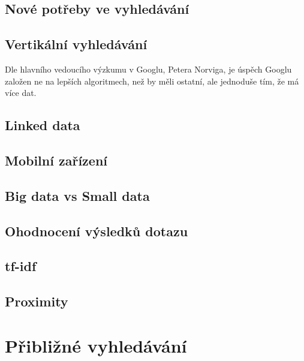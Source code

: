 \documentclass[11pt]{article}
\begin{document}

\subsection{Nové potřeby ve vyhledávání}
\subsection{Vertikální vyhledávání}
Dle hlavního vedoucího výzkumu v Googlu, Petera Norviga, je úspěch Googlu
založen ne na lepších algoritmech, než by měli ostatní, ale jednoduše tím, že
má více dat.
\subsection{Linked data}
\subsection{Mobilní zařízení}

\subsection{Big data vs Small data}

\subsection{Ohodnocení výsledků dotazu}
\subsection{tf-idf}
\subsection{Proximity}

\section{Přibližné vyhledávání}
\end{document}
